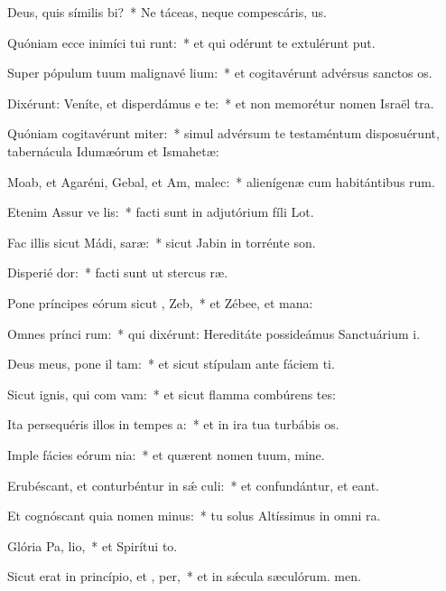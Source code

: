 \item Deus, quis símilis  bi?~* Ne táceas, neque compescáris, us.
\item Quóniam ecce inimíci tui runt:~* et qui odérunt te extulérunt put.
\item Super pópulum tuum malignavé lium:~* et cogitavérunt advérsus sanctos os.
\item Dixérunt: Veníte, et disperdámus e  te:~* et non memorétur nomen Israël tra.
\item Quóniam cogitavérunt miter:~* simul advérsum te testaméntum disposuérunt, tabernácula Idumæórum et Ismahetæ:
\item Moab, et Agaréni, Gebal, et Am,  malec:~* alienígenæ cum habitántibus rum.
\item Etenim Assur ve  lis:~* facti sunt in adjutórium fíli Lot.
\item Fac illis sicut Mádi,  saræ:~* sicut Jabin in torrénte son.
\item Disperié  dor:~* facti sunt ut stercus ræ.
\item Pone príncipes eórum sicut ,  Zeb,~* et Zébee, et mana:
\item Omnes prínci rum:~* qui dixérunt: Hereditáte possideámus Sanctuárium i.
\item Deus meus, pone il  tam:~* et sicut stípulam ante fáciem ti.
\item Sicut ignis, qui com vam:~* et sicut flamma combúrens tes:
\item Ita persequéris illos in tempes a:~* et in ira tua turbábis os.
\item Imple fácies eórum nia:~* et quærent nomen tuum, mine.
\item Erubéscant, et conturbéntur in sǽ culi:~* et confundántur, et eant.
\item Et cognóscant quia nomen  minus:~* tu solus Altíssimus in omni ra.
\item Glória Pa,  lio,~* et Spirítui to.
\item Sicut erat in princípio, et ,  per,~* et in sǽcula sæculórum. men.
